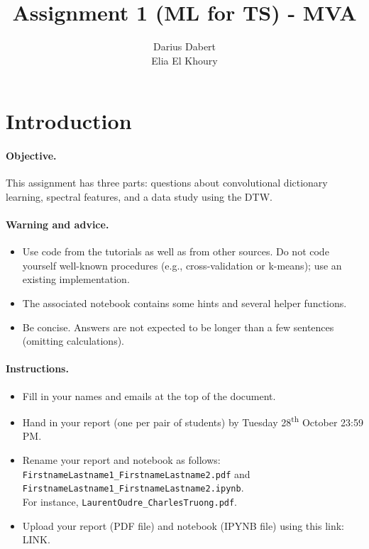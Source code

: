 \documentclass[11pt]{article}
\title{Assignment 1 (ML for TS) - MVA}
\author{
Darius Dabert \email{darius.dabert@polytechnique.edu} \\ %
Elia El Khoury \email{eliaelkhoury2@gmail.com} %
}
\begin{document}
\maketitle

\section{Introduction}

\paragraph{Objective.} This assignment has three parts: questions about convolutional dictionary learning, spectral features, and a data study using the DTW. 

\paragraph{Warning and advice.} 
\begin{itemize}
    \item Use code from the tutorials as well as from other sources. Do not code yourself well-known procedures (e.g., cross-validation or k-means); use an existing implementation. 
    \item The associated notebook contains some hints and several helper functions.
    \item Be concise. Answers are not expected to be longer than a few sentences (omitting calculations).
\end{itemize}



\paragraph{Instructions.}
\begin{itemize}
    \item Fill in your names and emails at the top of the document.
    \item Hand in your report (one per pair of students) by Tuesday 28\textsuperscript{th} October 23:59 PM.
    \item Rename your report and notebook as follows:\\ \texttt{FirstnameLastname1\_FirstnameLastname2.pdf} and\\ \texttt{FirstnameLastname1\_FirstnameLastname2.ipynb}.\\
    For instance, \texttt{LaurentOudre\_CharlesTruong.pdf}.
    \item Upload your report (PDF file) and notebook (IPYNB file) using this link: \footnotesize{LINK}.
\end{itemize}
\end{document}
